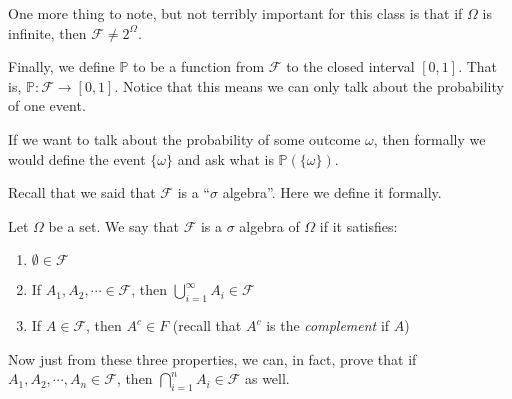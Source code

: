 \documentclass[notitlepage,abstract=on,twoside=semi]{scrartcl}
\newcommand{\om}{\ensuremath{\Omega}}
\newcommand{\F}{\ensuremath{\mathcal{F}}}
\newcommand{\Prob}{\ensuremath{\mathbb{P}}}
\begin{document}
One more thing to note, but not terribly important for this class is that if
$\om$ is infinite, then $\F \neq 2^{\om}$.

Finally, we define $\Prob$ to be a function from $\F$ to the closed interval
$[0, 1]$. That is, $\Prob : \F \to [0, 1]$. Notice that this means we can only
talk about the probability of one event.

If we want to talk about the probability of some outcome $\omega$, then
formally we would define the event $\{\omega\}$ and ask what is
$\Prob(\{\omega\})$.

Recall that we said that $\F$ is a ``$\sigma$ algebra''. Here we define it
formally.
\begin{definition}
  Let $\om$ be a set. We say that $\F$ is a $\sigma$ algebra of $\om$ if it
  satisfies:
  \begin{enumerate}
  \item $\emptyset \in \F$
  \item If $A_{1}, A_{2}, \cdots \in \F$, then $\bigcup_{i=1}^{\infty} A_{i}
    \in \F$
  \item If $A \in \F$, then $A^{c} \in F$ (recall that $A^{c}$ is the
    \textit{complement} if $A$)
  \end{enumerate}
\end{definition}
Now just from these three properties, we can, in fact, prove that if $A_{1},
A_{2}, \cdots, A_{n} \in \F$, then $\bigcap_{i=1}^{n} A_{i} \in \F$ as well.
\end{document}

